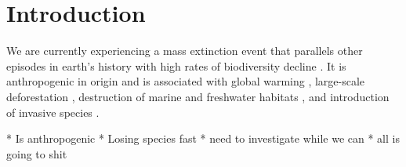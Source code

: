\chapter{Introduction}
\label{introduction}

We are currently experiencing a mass extinction event that parallels other episodes in earth's history with high rates of biodiversity decline \citep{Pimm1995, Dirzo2003, Schipper2008, Barnosky2011, Dirzo2014}. It is anthropogenic in origin \citep{Leakey1996, Ceballos2015} and is associated with global warming \citep{Cook2016, Wuebbles2017}, large-scale deforestation \citep{Wright2005}, destruction of marine and freshwater habitats \citep{Burkhead2012}, and introduction of invasive species \citep{Mooney2001}.

* Is anthropogenic
* Losing species fast
* need to investigate while we can
* all is going to shit
